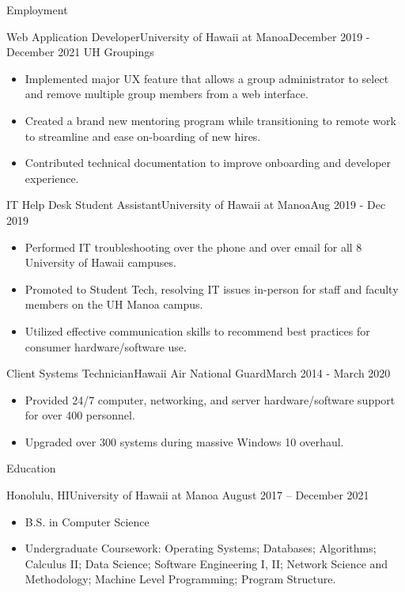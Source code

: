 \documentclass[]{mcdowellcv}
\begin{document}
	\makeheader
	
	\begin{cvsection}{Employment}
		\begin{cvsubsection}{Web Application Developer}{University of Hawaii at Manoa}{December 2019 - December 2021}
			UH Groupings			
			\begin{itemize}
				\item Implemented major UX feature that allows a group administrator to select and remove multiple group members from a web interface.
				\item Created a brand new mentoring program while transitioning to remote work to streamline and ease on-boarding of new hires.
				\item Contributed technical documentation to improve onboarding and developer experience.
			\end{itemize}
		\end{cvsubsection}
		
		\begin{cvsubsection}{IT Help Desk Student Assistant}{University of Hawaii at Manoa}{Aug 2019 - Dec 2019}		
			\begin{itemize}
				\item Performed IT troubleshooting over the phone and over email for all 8 University of Hawaii campuses. 
				\item Promoted to Student Tech, resolving IT issues in-person for staff and faculty members on the UH Manoa campus.
				\item Utilized effective communication skills to recommend best practices for consumer hardware/software use.
			\end{itemize}
		\end{cvsubsection}
		
		\begin{cvsubsection}{Client Systems Technician}{Hawaii Air National Guard}{March 2014 - March 2020}
			\begin{itemize}
				\item Provided 24/7 computer, networking, and server hardware/software support for over 400 personnel. 
				\item Upgraded over 300 systems during massive Windows 10 overhaul.
			\end{itemize}
		\end{cvsubsection}
	\end{cvsection}
	
	\begin{cvsection}{Education}
		\begin{cvsubsection}{Honolulu, HI}{University of Hawaii at Manoa }{August 2017 -- December 2021}
			\begin{itemize}
				\item B.S. in Computer Science
				\item Undergraduate Coursework: Operating Systems; Databases; Algorithms; Calculus II; Data Science; Software Engineering I, II; Network Science and Methodology; Machine Level Programming; Program Structure.
			\end{itemize}
		\end{cvsubsection}
	\end{cvsection}
	
\end{document}
